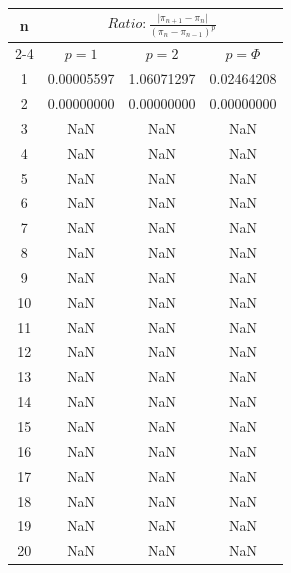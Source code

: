 \documentclass{article}
\providecommand{\abs}[1]{\lvert#1\rvert}
\begin{document}
\begin{tabular}{|c|c|c|c|}
\hline
\multirow{2}{*}{n} & \multicolumn{3}{|c|}{$Ratio:\displaystyle\frac{\abs{\pi_{n+1}-\pi_{n}}}{({\pi_{n}-\pi_{n-1}})^p}$} \\
\cline{2-4}
 & $p=1$ & $p=2$ & $p=\Phi$ \\
\hline
 1 & 0.00005597 & 1.06071297 & 0.02464208 \\ 
  2 & 0.00000000 & 0.00000000 & 0.00000000 \\ 
  3 & NaN & NaN & NaN \\ 
  4 & NaN & NaN & NaN \\ 
  5 & NaN & NaN & NaN \\ 
  6 & NaN & NaN & NaN \\ 
  7 & NaN & NaN & NaN \\ 
  8 & NaN & NaN & NaN \\ 
  9 & NaN & NaN & NaN \\ 
 10 & NaN & NaN & NaN \\ 
 11 & NaN & NaN & NaN \\ 
 12 & NaN & NaN & NaN \\ 
 13 & NaN & NaN & NaN \\ 
 14 & NaN & NaN & NaN \\ 
 15 & NaN & NaN & NaN \\ 
 16 & NaN & NaN & NaN \\ 
 17 & NaN & NaN & NaN \\ 
 18 & NaN & NaN & NaN \\ 
 19 & NaN & NaN & NaN \\ 
 20 & NaN & NaN & NaN \\ 
 \hline 
\end{tabular}
\end{document}

